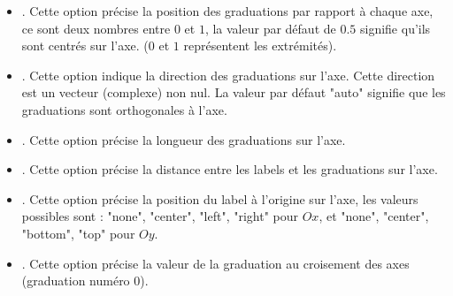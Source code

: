 \documentclass[%
10pt,%
a4paper,%
french,%
]%
{article}%
\begin{document}
\begin{itemize}
\begin{itemize}
            \item {}. Cette option précise la position des graduations par rapport à chaque axe, ce sont deux nombres entre $0$ et $1$, la valeur par défaut de $0.5$ signifie qu'ils sont centrés sur l'axe. ($0$ et $1$ représentent les extrémités).
            \item {}. Cette option indique la direction des graduations sur l'axe. Cette direction est un vecteur (complexe) non nul. La valeur par défaut "auto" signifie que les graduations sont orthogonales à l'axe.
            \item {}. Cette option précise la longueur des graduations sur l'axe.
            \item {}. Cette option précise la distance entre les labels et les graduations sur l'axe.
            \item {}. Cette option précise la position du label à l'origine sur l'axe, les valeurs possibles sont : "none", "center", "left", "right" pour $Ox$, et "none", "center", "bottom", "top" pour $Oy$.
            \item {}. Cette option précise la valeur de la graduation au croisement des axes (graduation numéro $0$). 
            

\end{itemize}
\end{itemize}
\end{document}
